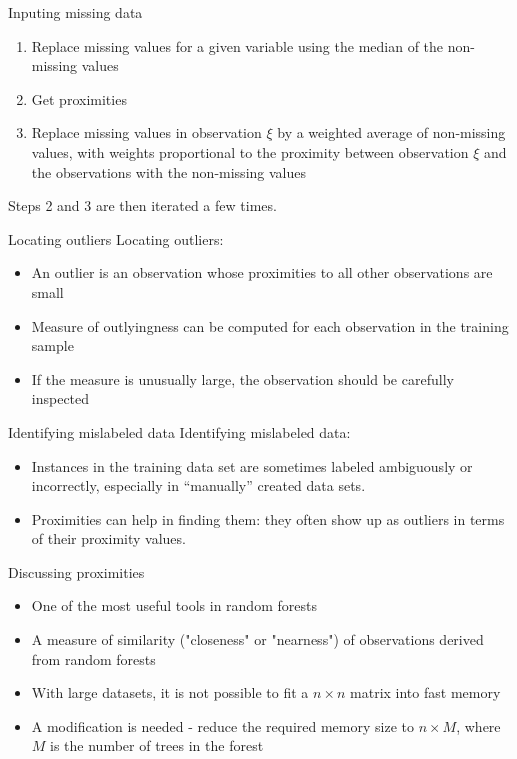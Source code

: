 \documentclass[11pt,compress,t,notes=noshow, xcolor=table]{beamer}
\begin{document}
\begin{vbframe}{Inputing missing data}
\begin{enumerate}
\item Replace missing values for a given variable using the median of the non-missing values
\item Get proximities
\item Replace missing values in observation $\xi$ by a weighted average of non-missing values, with weights proportional to the proximity between observation $\xi$ and the observations with the non-missing values
\end{enumerate}
Steps 2 and 3 are then iterated a few times. %
\end{vbframe}

\begin{vbframe}{Locating outliers}
Locating outliers: 
\begin{itemize}
\item An outlier is an observation whose proximities to all other observations are small
\item Measure of outlyingness can be computed for each observation in the training sample
\item If the measure is unusually large, the observation should be carefully inspected
\end{itemize}
\end{vbframe}

\begin{vbframe}{Identifying mislabeled data}
Identifying mislabeled data:
\begin{itemize}
\item Instances in the training data set are sometimes labeled ambiguously or incorrectly, especially in \enquote{manually} created data sets.
\item Proximities can help in finding them: they often show up as outliers in terms of their proximity values. 
\end{itemize}
\end{vbframe}

\begin{vbframe}{Discussing proximities}
\begin{itemize}
  \item One of the most useful tools in random forests
  \item A measure of similarity ("closeness" or "nearness") of observations derived from random forests
  \item With large datasets, it is not possible to fit a $n \times n$ matrix into fast memory
  \item A modification is needed - reduce the required memory size to $n \times M$, where $M$ is the number of trees in the forest
\end{itemize}
\end{vbframe}

\endlecture
\end{document}

